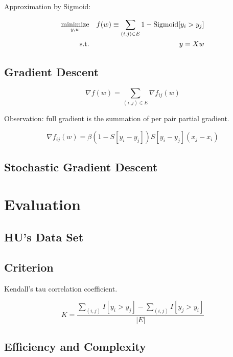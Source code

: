 \documentclass{sig-alternate}
\begin{document}
Approximation by Sigmoid:

\begin{eqnarray}
	\operatorname*{minimize}_{y,w} && f(w) \equiv \sum_{(i,j) \in E} 1 - \text{Sigmoid}[y_i > y_j] \\
	\text{s.t.} && y = Xw
\end{eqnarray}


\subsection{Gradient Descent}
\label{sec:Gradient Descent}

\begin{equation}
	\nabla f(w) = \sum_{(i,j) \in E} \nabla f_{ij}(w) 
\end{equation}

Observation: full gradient is the summation of
per pair partial gradient. 

\begin{equation}
	\nabla f_{ij}(w) = \beta (1-S[y_i - y_j])S[y_i-y_j](x_j-x_i)
\end{equation}

\subsection{Stochastic Gradient Descent}
\label{sec:Stochastic Gradient Descent}


\section{Evaluation}
\label{sec:Evaluation}

\subsection{HU's Data Set}
\label{sec:HU's Data Set}

\subsection{Criterion}
\label{sec:Criterion}

Kendall's tau correlation coefficient. 

\begin{equation}
	K = \frac{\sum_{(i,j)}{I[y_i>y_j]} - \sum_{(i,j)}{I[y_j>y_i]}}{|E|}
\end{equation}

\subsection{Efficiency and Complexity}
\label{sec:Efficiency and Complexity}
\end{document}

